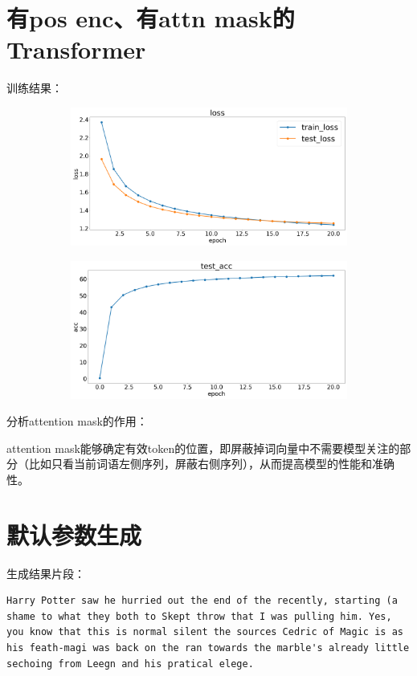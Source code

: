 \documentclass[11pt, a4paper]{article}
\begin{document}
\section{有pos enc、有attn mask的Transformer}
训练结果：
\begin{figure}[H]
    \hfill
    \begin{subfigure}[t]{0.45\linewidth}
        \includegraphics[width=\textwidth]{img/5-1.png}
    \end{subfigure}
    \hfill
    \begin{subfigure}[t]{0.45\linewidth}
        \includegraphics[width=\textwidth]{img/5-2.png}
    \end{subfigure}
    \hfill
\end{figure}


分析attention mask的作用：

attention mask能够确定有效token的位置，即屏蔽掉词向量中不需要模型关注的部分（比如只看当前词语左侧序列，屏蔽右侧序列），从而提高模型的性能和准确性。

\section{默认参数生成}
生成结果片段：
\begin{lstlisting}
Harry Potter saw he hurried out the end of the recently, starting (a shame to what they both to Skept throw that I was pulling him. Yes, you know that this is normal silent the sources Cedric of Magic is as his feath-magi was back on the ran towards the marble's already little sechoing from Leegn and his pratical elege. 
\end{lstlisting}
\end{document}
